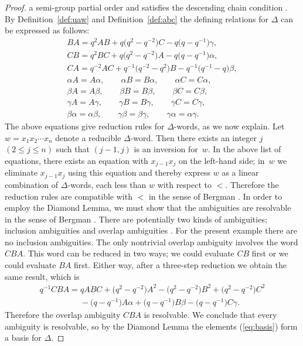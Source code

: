 \documentclass[pdftex]{sigma}
\numberwithin{equation}{section}
\begin{document}
\begin{proof}
a semi-group partial order
\cite[p.~181]{berg} and satisf\/ies the
descending chain condition
\cite[p.~179]{berg}.
By Def\/inition~\ref{def:uaw} and
Def\/inition~\ref{def:abc}
the def\/ining relations for $\Delta $ can be expressed
as follows:
\begin{gather*}
 BA  =  q^2AB+q\big(q^2-q^{-2}\big)C-q\big(q-q^{-1}\big)\gamma,
\\
 CB  =  q^2BC+q\big(q^2-q^{-2}\big)A-q\big(q-q^{-1}\big)\alpha,
\\
 CA  =  q^{-2}AC+q^{-1}\big(q^{-2}-q^2\big)B-q^{-1}\big(q^{-1}-q\big)\beta,
\\
 \alpha A = A \alpha,
  \qquad
\alpha B = B \alpha,
  \qquad
\alpha C = C \alpha,
\\
 \beta A = A \beta,
  \qquad
\beta B = B \beta,
  \qquad
\beta C = C \beta,
\\
 \gamma A = A \gamma,
  \qquad
\gamma B = B \gamma,
  \qquad
\gamma C = C \gamma,
\\
 \beta \alpha = \alpha \beta,
  \qquad
\gamma \beta = \beta \gamma,
  \qquad
\gamma \alpha = \alpha \gamma.
\end{gather*}
The above equations give reduction rules
for $\Delta$-words,
as we now explain.
Let $w=x_1x_2\cdots x_n$ denote a  reducible $\Delta $-word.
Then there exists an integer $j$ $(2 \leq j \leq n)$
such that $(j-1,j)$ is an inversion for~$w$.
In the above list of equations,
there exists an equation
with $x_{j-1}x_j$ on the left-hand side;
in~$w$ we eliminate $x_{j-1}x_j$ using this equation
and thereby express $w$ as a linear combination of
$\Delta $-words, each less than $w$ with respect to $<$.
Therefore
the reduction rules are compatible
with $<$ in the sense of Bergman \cite[p.~181]{berg}.
In order to employ the Diamond Lemma,
we must show that
the ambiguities
are resolvable in the sense of Bergman
\cite[p.~181]{berg}.
There are potentially two kinds of ambiguities; inclusion
ambiguities and overlap ambiguities
\cite[p.~181]{berg}.
For the present example there are no inclusion ambiguities.
The only nontrivial overlap ambiguity
involves the word
$CBA$. This word can be reduced
in two ways; we could evaluate $CB$ f\/irst or we could
evaluate $BA$ f\/irst.
 Either way, after a three-step reduction
we obtain the same result, which is
\begin{gather*}
 q^{-1}CBA = qABC
+\big(q^2-q^{-2}\big)A^2
-\big(q^2-q^{-2}\big)B^2
+\big(q^2-q^{-2}\big)C^2
\\
\phantom{q^{-1}CBA =}{}
- \big(q-q^{-1}\big)A \alpha
+ \big(q-q^{-1}\big)B \beta
- \big(q-q^{-1}\big)C \gamma .
\end{gather*}
Therefore the
overlap ambiguity $CBA$ is re\-sol\-vable.
We conclude that every  ambiguity is
re\-sol\-vable, so
by the Diamond Lemma
\cite[Theorem~1.2]{berg}
the elements
(\ref{eq:basis}) form a basis for
$\Delta $.
\end{proof}
\end{document}
